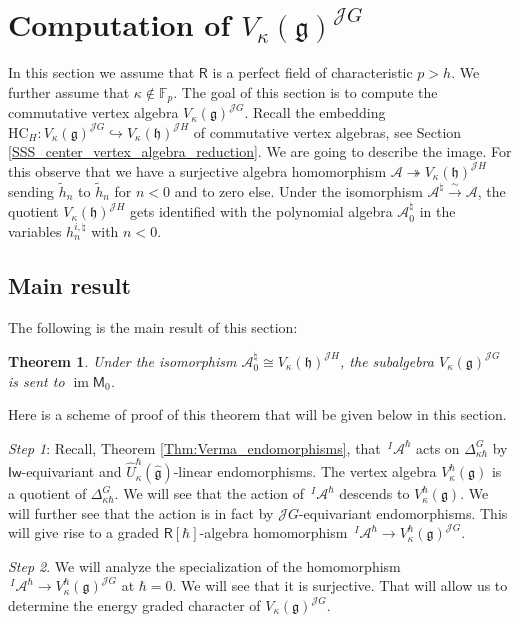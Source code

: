 \documentclass{amsart}
\newtheorem{Thm}{Theorem}[subsection]
\theoremstyle{definition}
\newcommand{\Ring}{\mathsf{R}}
\newcommand{\g}{\mathfrak{g}}
\newcommand{\h}{\mathfrak{h}}
\newcommand{\HC}{\mathrm{HC}} %
\newcommand{\F}{\mathbb{F}}
\newcommand{\A}{\mathscr{A}}
\newcommand{\Jet}{\mathscr{J}}
\newcommand{\Iw}{\mathsf{Iw}}
\numberwithin{equation}{section}
\begin{document}
\section{Computation of $V_\kappa(\g)^{\Jet G}$}\label{S_V_inv}
In this section we assume that $\Ring$ is a perfect field of characteristic $p>h$. We further assume that $\kappa\not\in \F_p$.
The goal of this section is to compute the commutative vertex algebra 
$V_\kappa(\g)^{\Jet G}$. Recall the embedding $\HC_H:
V_\kappa(\g)^{\Jet G}\hookrightarrow V_\kappa(\h)^{\Jet H}$ of commutative vertex algebras, see Section \ref{SSS_center_vertex_algebra_reduction}. We are going to describe the image. 
For this observe that we have a surjective algebra homomorphism
$\A\twoheadrightarrow V_\kappa(\h)^{\Jet H}$ sending $\tilde{h}_n$ to $\tilde{h}_n$ for $n<0$ and to zero else. Under the isomorphism 
$\A^\natural\xrightarrow{\sim}\A$, the quotient $V_\kappa(\h)^{\Jet H}$ gets identified with the polynomial algebra $\A^\natural_0$ in the variables $h^{i,\natural}_n$ with $n<0$. 

\subsection{Main result}
The following is the main result of this section:

\begin{Thm}\label{Thm:VA_invariants} \label{t:tungus}
Under the isomorphism $\A^\natural_0\cong V_\kappa(\h)^{\Jet H}$, the subalgebra $V_\kappa(\g)^{\Jet G}$ is sent to $\operatorname{im}\mathsf{M}_0$. 
\end{Thm}

Here is a scheme of proof of this theorem that will be given below in this section. 

{\it Step 1}: Recall, Theorem \ref{Thm:Verma_endomorphisms}, that $\,^I\!\A^\hbar$ acts on $\Delta^G_{\kappa\hbar}$ by $\Iw$-equivariant and $\widehat{U}^{\hbar}_\kappa(\hat{\g})$-linear endomorphisms. 
The vertex algebra $V^\hbar_\kappa(\g)$ is a quotient of $\Delta^G_{\kappa\hbar}$. We will see that the action of $\,^I\!\A^\hbar$ descends to $V^\hbar_\kappa(\g)$. We will further see that the action is in fact by $\Jet G$-equivariant endomorphisms. This will give rise to a graded $\Ring[\hbar]$-algebra homomorphism $\,^I\!\A^\hbar\rightarrow V^\hbar_\kappa(\g)^{\Jet G}$.

{\it Step 2}. We will analyze the specialization of the homomorphism 
$\,^I\!\A^\hbar\rightarrow V^\hbar_\kappa(\g)^{\Jet G}$ at $\hbar=0$.
We will see that it is surjective. That will allow us to determine the energy graded character of $V_\kappa(\g)^{\Jet G}$.
\end{document}
